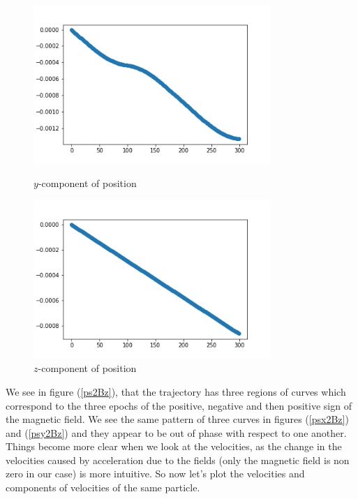 \documentclass[12pt]{article}
\begin{document}
	\begin{figure}[H]
		\begin{multicols}{2}
			\includegraphics[width=\linewidth, height=6cm]{psy2Bz.png} \caption{$y$-component of position} \label{psy2Bz} \par
			\includegraphics[width=\linewidth, height=6cm]{psz2Bz.png} \caption{$z$-component of position} \label{psz2Bz} \par
		\end{multicols}
	\end{figure}
	\noindent We see in figure (\ref{ps2Bz}), that the trajectory has three regions of curves which correspond to the three epochs of the positive, negative and then positive sign of the magnetic field. We see the same pattern of three curves in figures (\ref{psx2Bz}) and (\ref{psy2Bz}) and they appear to be out of phase with respect to one another. Things become more clear when we look at the velocities, as the change in the velocities caused by acceleration due to the fields (only the magnetic field is non zero in our case) is more intuitive. So now let's plot the velocities and components of velocities of the same particle.
\end{document}
